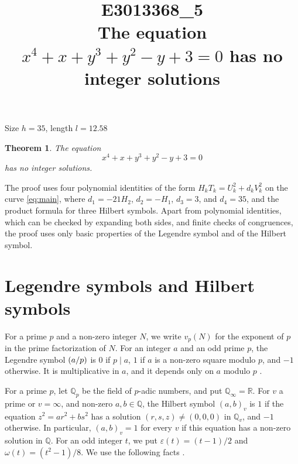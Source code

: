 \documentclass[11pt]{article}
\title{\textbf{E3013368\_5}\\[4pt] {\Large The equation $x^{4}+x+y^{3}+y^{2}-y+3=0$ has no integer solutions}}
\author{}
\date{}
\newtheorem{theorem}{Theorem}
\newcommand{\Q}{\mathbb{Q}}
\newcommand{\leg}[2]{\mathchoice{\biggl(\dfrac{#1}{#2}\biggr)}{(#1/#2)}{(#1/#2)}{(#1/#2)}}
\begin{document}
\maketitle
\vspace{-8ex}
\begin{center}
Size $h=35$, length $l=12.58$
\end{center}

\begin{theorem}\label{thm:main}
The equation
\begin{equation}\label{eq:main}
x^{4}+x+y^{3}+y^{2}-y+3=0
\end{equation}
has no integer solutions.
\end{theorem}

The proof uses four polynomial identities of the form $H_kT_k=U_k^2+d_kV_k^2$ on the curve \eqref{eq:main}, where $d_{1}=-21H_{2}$, $d_{2}=-H_{1}$, $d_{3}=3$, and $d_{4}=35$, and the product formula for three Hilbert symbols. Apart from polynomial identities, which can be checked by expanding both sides, and finite checks of congruences, the proof uses only basic properties of the Legendre symbol and of the Hilbert symbol.

\section{Legendre symbols and Hilbert symbols}

For a prime $p$ and a non-zero integer $N$, we write $v_p(N)$ for the exponent of $p$ in the prime factorization of $N$. For an integer $a$ and an odd prime $p$, the Legendre symbol $\leg{a}{p}$ is $0$ if $p\mid a$, $1$ if $a$ is a non-zero square modulo $p$, and $-1$ otherwise. It is multiplicative in $a$, and it depends only on $a$ modulo $p$ \cite[Chapter~5]{IR}.

For a prime $p$, let $\Q_p$ be the field of $p$-adic numbers, and put $\Q_\infty=\mathbb R$. For $v$ a prime or $v=\infty$, and non-zero $a,b\in\Q$, the Hilbert symbol $(a,b)_v$ is $1$ if the equation $z^2=ar^2+bs^2$ has a solution $(r,s,z)\neq(0,0,0)$ in $\Q_v$, and $-1$ otherwise. In particular, $(a,b)_v=1$ for every $v$ if this equation has a non-zero solution in $\Q$. For an odd integer $t$, we put $\varepsilon(t)=(t-1)/2$ and $\omega(t)=(t^2-1)/8$. We use the following facts \cite[Chapter~III, Proposition~2 and Theorems~1 and~3]{Se}.
\end{document}
